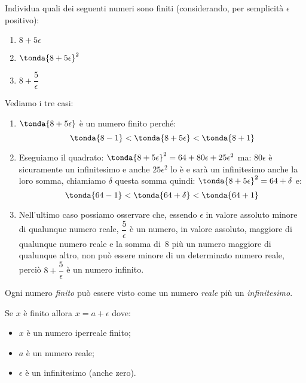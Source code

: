 \begin{esempio}
 Individua quali dei seguenti numeri sono finiti (considerando, per 
semplicità \(\epsilon\) positivo):

\begin{multicols}{3}
\begin{enumerate}
 \item \(8+5\epsilon\)
 \item \(\tonda{8+5\epsilon}^2\)
 \item \(8+\dfrac{5}{\epsilon}\)
\end{enumerate}
\end{multicols}

Vediamo i tre casi:

\begin{enumerate}
 \item \(\tonda{8+5\epsilon}\) è un numero finito perché:
 \[\tonda{8-1} < \tonda{8+5\epsilon} < \tonda{8+1}\]
 \item Eseguiamo il quadrato:
 \(\tonda{8+5\epsilon}^2 = 64 +80 \epsilon +25 \epsilon^2\)
 ma: \(80 \epsilon\) è sicuramente un infinitesimo e anche \(25 \epsilon^2\)
 lo è e sarà un infinitesimo anche la loro somma, chiamiamo \(\delta\) 
questa somma quindi: 
\(\tonda{8+5\epsilon}^2 = 64 + \delta\)
e: 
\[\tonda{64 -1} < \tonda{64 + \delta} < \tonda{64 +1}\]
 \item Nell'ultimo caso possiamo osservare che, essendo \(\epsilon\) in 
valore assoluto minore di qualunque numero reale, 
 \(\dfrac{5}{\epsilon}\) è un numero, in valore assoluto,  maggiore di 
qualunque numero reale e la somma di~8 più un numero maggiore di qualunque 
altro, non può essere minore di un determinato numero reale, 
perciò \(8+\dfrac{5}{\epsilon}\) è un numero infinito.
\end{enumerate}
\end{esempio}

\noindent Ogni numero \emph{finito} può essere visto come un numero 
\emph{reale} più un \emph{infinitesimo}.

Se \(x\) è finito allora \(x = a + \epsilon\) dove:
\begin{itemize} [noitemsep]
 \item \(x\) è un numero iperreale finito;
 \item \(a\) è un numero reale;
 \item \(\epsilon\) è un infinitesimo (anche zero).
\end{itemize}


